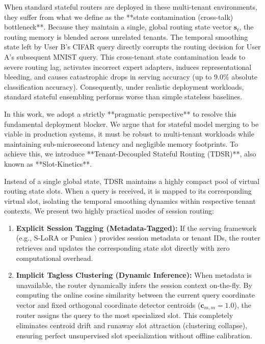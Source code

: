 When standard stateful routers are deployed in these multi-tenant environments, they suffer from what we define as the **state contamination (cross-talk) bottleneck**. Because they maintain a single, global routing state vector $\mathbf{s}_t$, the routing memory is blended across unrelated tenants. The temporal smoothing state left by User B's CIFAR query directly corrupts the routing decision for User A's subsequent MNIST query. This cross-tenant state contamination leads to severe routing lag, activates incorrect expert adapters, induces representational bleeding, and causes catastrophic drops in serving accuracy (up to 9.0\% absolute classification accuracy). Consequently, under realistic deployment workloads, standard stateful ensembling performs worse than simple stateless baselines.

In this work, we adopt a strictly **pragmatic perspective** to resolve this fundamental deployment blocker. We argue that for stateful model merging to be viable in production systems, it must be robust to multi-tenant workloads while maintaining sub-microsecond latency and negligible memory footprints. To achieve this, we introduce **Tenant-Decoupled Stateful Routing (TDSR)**, also known as **Slot-Kinetics**.

Instead of a single global state, TDSR maintains a highly compact pool of virtual routing state slots. When a query is received, it is mapped to its corresponding virtual slot, isolating the temporal smoothing dynamics within respective tenant contexts. We present two highly practical modes of session routing:
\begin{enumerate}
    \item \textbf{Explicit Session Tagging (Metadata-Tagged):} If the serving framework (e.g., S-LoRA \cite{s-lora} or Punica \cite{chen2023punica}) provides session metadata or tenant IDs, the router retrieves and updates the corresponding state slot directly with zero computational overhead.
    \item \textbf{Implicit Tagless Clustering (Dynamic Inference):} When metadata is unavailable, the router dynamically infers the session context on-the-fly. By computing the online cosine similarity between the current query coordinate vector and fixed orthogonal coordinate detector centroids ($\mathbf{c}_{m, m} = 1.0$), the router assigns the query to the most specialized slot. This completely eliminates centroid drift and runaway slot attraction (clustering collapse), ensuring perfect unsupervised slot specialization without offline calibration.
\end{enumerate}


